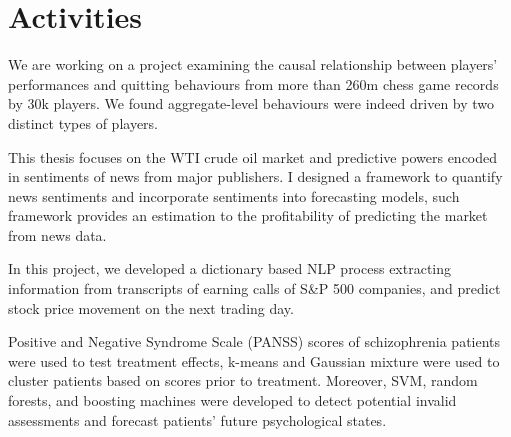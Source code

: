 \documentclass[letterpaper]{deedy-resume} %
\begin{document}
\begin{minipage}[t]{0.66\textwidth}


\section{Activities}
\small{We are working on a project examining the causal relationship between players' performances and quitting behaviours from more than 260m chess game records by 30k players. We found aggregate-level behaviours were indeed driven by two distinct types of players.}

\sectionspace %
 

\small {This thesis focuses on the WTI crude oil market and predictive powers encoded in sentiments of news from major publishers. I designed a framework to quantify news sentiments and incorporate sentiments into forecasting models, such framework provides an estimation to the profitability of predicting the market from news data.}

\sectionspace %


\small {In this project, we developed a dictionary based NLP process extracting information from transcripts of earning calls of S\&P 500 companies, and predict stock price movement on the next trading day.}

\sectionspace %


\small {Positive and Negative Syndrome Scale (PANSS) scores of schizophrenia patients were used to test treatment effects, k-means and Gaussian mixture were used to cluster patients based on scores prior to treatment. Moreover, SVM, random forests, and boosting machines were developed to detect potential invalid assessments and forecast patients' future psychological states.}


\end{minipage}
\end{document}
